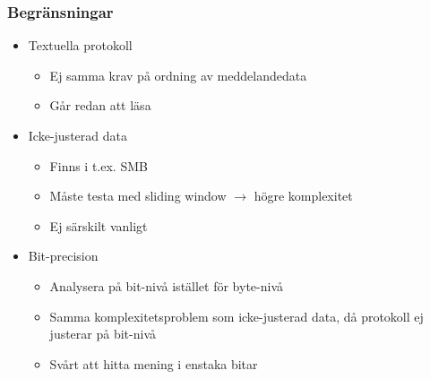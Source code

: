 \documentclass[xetex, 8pt]{beamer}
\begin{document}
    \begin{frame}
        \frametitle{Begränsningar}
        \begin{itemize}
            \item Textuella protokoll
                \begin{itemize}
                    \item Ej samma krav på ordning av meddelandedata
                    \item Går redan att läsa
                \end{itemize}
            \item Icke-justerad data
                \begin{itemize}
                    \item Finns i t.ex. SMB
                    \item Måste testa med sliding window $\rightarrow$ högre komplexitet
                    \item Ej särskilt vanligt
                \end{itemize}
            \item Bit-precision
                \begin{itemize}
                    \item Analysera på bit-nivå istället för byte-nivå
                    \item Samma komplexitetsproblem som icke-justerad data, då protokoll
                        ej justerar på bit-nivå
                    \item Svårt att hitta mening i enstaka bitar
                \end{itemize}
        \end{itemize}
    \end{frame}
\end{document}
